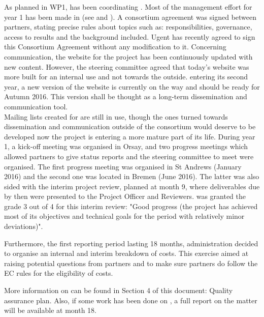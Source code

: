 \documentclass{deliverablereport}
\begin{document}
As planned in WP1,  has been coordinating \ODK. 
Most of the management effort for year 1 has been made in  (see  and ). 
A consortium agreement was signed between partners, stating precise rules about topics such as: responsibilities,
 governance, access to results and the background included. Ugent has recently agreed to sign this Consortium Agreement without any modification to it.
 Concerning communication, the website for the project has been 
continuously updated with new content. However, the
steering committee agreed that today's website was more built for an internal use and not towards the outside. 
\ODK entering its second year, a new version of the website
 is currently on the way and should be ready for Autumn 2016. This version shall be thought as a long-term dissemination and communication tool.
\\Mailing lists created for \ODK are still in use, though the ones turned towards dissemination and communication outside of the 
consortium would deserve to be developed now
the project is entering a more mature part of its life. 
During year 1, a kick-off meeting was organised in Orsay, and two progress meetings which allowed partners to give status reports 
and the steering committee to meet were organised.
 The first progress meeting was organised in St Andrews (January 2016) and the second one was located in Bremen (June 2016).
The latter was also sided with the interim project review, planned at month 9, where deliverables due by then were presented to 
the Project Officer and Reviewers.
\ODK was granted the grade 3 out of 4 for this interim review: "Good progress (the project has achieved most of its objectives and technical goals for the 
period with relatively minor deviations)".

Furthermore, the first reporting period lasting 18 months,  administration decided to organise an internal and interim 
breakdown of costs. This exercise aimed at raising potential questions from partners and to make sure partners do follow
the EC rules for the eligibility of costs.

More information on  can be found in Section 4 of this document:
 Quality assurance plan.
Also, if some work has been done on , a full report on the matter will
 be available at month 18.
\end{document}
